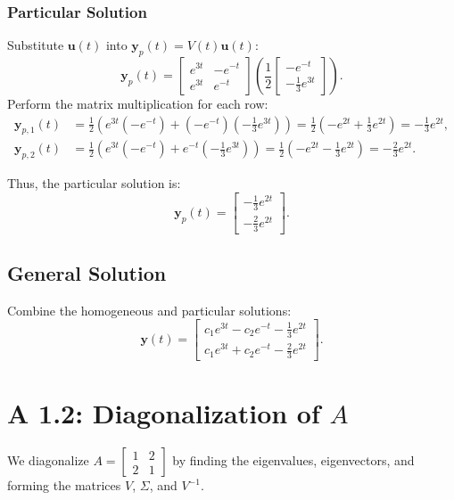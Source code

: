 \documentclass[12pt]{article}
\begin{document}
\subsubsection*{Particular Solution}
Substitute \( \mathbf{u}(t) \) into \( \mathbf{y}_p(t) = V(t)\mathbf{u}(t) \):
\[
\mathbf{y}_p(t) = \begin{bmatrix} e^{3t} & -e^{-t} \\ e^{3t} & e^{-t} \end{bmatrix}\left(\frac{1}{2}\begin{bmatrix} -e^{-t} \\ -\frac{1}{3}e^{3t} \end{bmatrix}\right).
\]
Perform the matrix multiplication for each row:
\begin{align*}
\mathbf{y}_{p,1}(t) &= \frac{1}{2}\left(e^{3t}(-e^{-t}) + (-e^{-t})(-\frac{1}{3}e^{3t})\right) = \frac{1}{2}\left(-e^{2t} + \frac{1}{3}e^{2t}\right) = -\frac{1}{3}e^{2t}, \\
\mathbf{y}_{p,2}(t) &= \frac{1}{2}\left(e^{3t}(-e^{-t}) + e^{-t}(-\frac{1}{3}e^{3t})\right) = \frac{1}{2}\left(-e^{2t} - \frac{1}{3}e^{2t}\right) = -\frac{2}{3}e^{2t}.
\end{align*}

Thus, the particular solution is:
\[
\mathbf{y}_p(t) = \begin{bmatrix} -\frac{1}{3}e^{2t} \\ -\frac{2}{3}e^{2t} \end{bmatrix}.
\]

\subsection*{General Solution}
Combine the homogeneous and particular solutions:
\[
\mathbf{y}(t) = \begin{bmatrix} c_1e^{3t} - c_2e^{-t} - \frac{1}{3}e^{2t} \\ c_1e^{3t} + c_2e^{-t} - \frac{2}{3}e^{2t} \end{bmatrix}.
\]

\section*{A 1.2: Diagonalization of \(A\)}
We diagonalize \(A = \begin{bmatrix} 1 & 2 \\ 2 & 1 \end{bmatrix}\) by finding the eigenvalues, eigenvectors, and forming the matrices \(V\), \(\Sigma\), and \(V^{-1}\).
\end{document}
